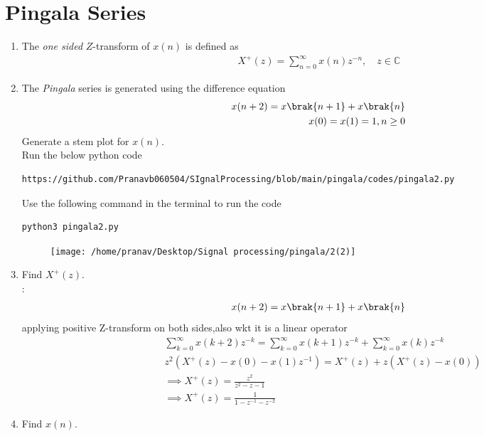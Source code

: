 \documentclass[journal,12pt,twocolumn]{IEEEtran}
\renewcommand\thesection{\arabic{section}}
\begin{document}
\section{Pingala Series}
\begin{enumerate}[label=\thesection.\arabic*,ref=\thesection.\theenumi]
\item The {\em one sided} $Z$-transform of $x(n)$ is defined as 
\begin{align}
	X^{+}(z) = \sum_{n = 0}^{\infty}x(n)z^{-n}, \quad z \in \mathbb{C}
\label{eq:one-Z}
\end{align}
	\item The {\em Pingala} series is generated using the difference equation 
\begin{align*}
	x(n+2) = x\brak{n+1} + x\brak{n}\\
	 x(0) = x(1) = 1, n \ge 0
	\label{eq:10-pingala}
\end{align*}
Generate a stem plot for $x(n)$.\\
\solution
Run the below python code 
\begin{lstlisting}
https://github.com/Pranavb060504/SIgnalProcessing/blob/main/pingala/codes/pingala2.py
\end{lstlisting}
Use the following command in the terminal to run the code
\begin{lstlisting}
python3 pingala2.py
\end{lstlisting}
\begin{figure}[ht!]
\centering
\texttt{[image: /home/pranav/Desktop/Signal processing/pingala/2(2)]}
\caption{}
\end{figure}
\item Find $X^{+}(z)$.\\
\solution:
\begin{align}
	x(n+2) = x\brak{n+1} + x\brak{n}
	\end{align}
	applying positive Z-transform on both sides,also wkt it is a linear operator
	\begin{align}
	&\sum_{k=0}^{\infty}x(k+2)z^{-k}=\sum_{k=0}^{\infty}x(k+1)z^{-k}+\sum_{k=0}^{\infty}x(k)z^{-k}\\
	&z^{2}(X^{+}(z)-x(0)-x(1)z^{-1})=X^{+}(z)+z(X^{+}(z)-x(0))\\
	&\implies X^{+}(z)=\frac{z^{2}}{z^{2}-z-1}\\
	&\implies X^{+}(z)=\frac{1}{1-z^{-1}-z^{-2}}
	\end{align}
	\item Find $x(n)$.\\

\end{enumerate}
\end{document}
